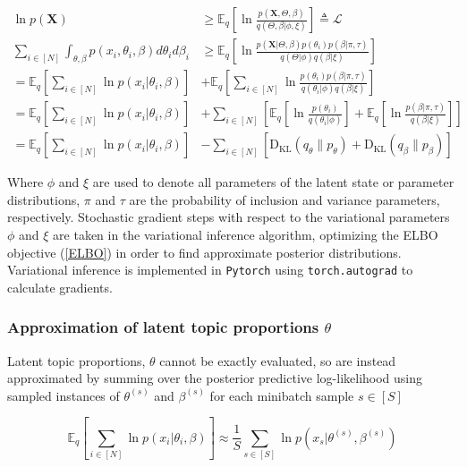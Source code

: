 \begin{align}
    \ln p(\textbf{X}) & \geq 
    \mathbb{E}_q \left[\ln \frac{ p(\textbf{X}, \Theta, \beta)}{q(\Theta, \beta | \phi, \xi)}\right] \triangleq \mathcal{L}\\
    \sum_{i\in [N]}\int_{\theta, \beta}p(x_i, \theta_i, \beta) d\theta_i d\beta_i & \geq\mathbb{E}_q\left[\ln \frac{p(\textbf{X} | \Theta, \beta) p(\theta_i) p(\beta | \pi, \tau)}{q(\Theta | \phi)q(\beta | \xi)}\right]    \\
     \label{ELBO} = \mathbb{E}_q\left[\sum_{i\in [N]}\ln p(x_i | \theta_i, \beta)\right] &+ \mathbb{E}_q \left[\sum_{i\in [N]} \ln \frac{p(\theta_i)p(\beta | \pi, \tau)}{q(\theta_i|\phi)q(\beta|\xi)}\right] \\ 
     = \mathbb{E}_q \left[\sum_{i\in [N]}\ln p(x_i | \theta_i, \beta)\right] &+ \sum_{i\in [N]} \left[ \mathbb{E}_q \left[\ln \frac{p(\theta_i)}{q(\theta_i|\phi)}\right] + \mathbb{E}_q \left[\ln \frac{p(\beta | \pi, \tau)}{q(\beta|\xi)}\right]\right]\\
     \label{KL-elbo} = \mathbb{E}_q \left[\sum_{i\in [N]}\ln p(x_i | \theta_i, \beta)\right] &- \sum_{i\in [N]} \left[\text{D}_{\text{KL}}(q_\theta \parallel p_\theta) + \text{D}_{\text{KL}} (q_\beta \parallel p_\beta)\right]
\end{align}

Where $\phi$ and $\xi$ are used to denote all parameters of the latent state or parameter distributions, $\pi$ and $\tau$ are the probability of inclusion and variance parameters, respectively. Stochastic gradient steps with respect to the variational parameters $\phi$ and $\xi$ are taken in the variational inference algorithm, optimizing the ELBO objective (\ref{ELBO}) in order to find approximate posterior distributions. Variational inference is implemented in \texttt{Pytorch} using \texttt{torch.autograd} \cite{pytorch, pytorchdiff} to calculate gradients. 

\subsubsection{Approximation of latent topic proportions $\theta$}

Latent topic proportions, $\theta$ cannot be exactly evaluated, so are instead approximated by summing over the posterior predictive log-likelihood using sampled instances of $\theta^{(s)}$ and $\beta^{(s)}$ for each minibatch sample $s \in [S]$

\begin{equation}
    \mathbb{E}_q \left[\sum_{i\in [N]} \ln p(x_i|\theta_i, \beta)\right] \approx \frac{1}{S} \sum_{s \in [S]} \ln p(x_s | \theta^{(s)}, \beta^{(s)})
\end{equation}

